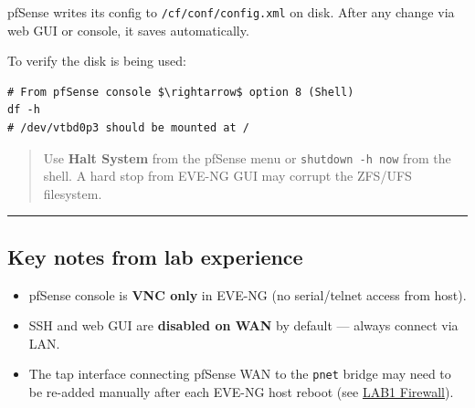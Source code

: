 pfSense writes its config to \texttt{/cf/conf/config.xml} on disk. After any change via web GUI or console, it saves automatically.

To verify the disk is being used:

\begin{lstlisting}
# From pfSense console $\rightarrow$ option 8 (Shell)
df -h
# /dev/vtbd0p3 should be mounted at /
\end{lstlisting}

\begin{quote}
Use \textbf{Halt System} from the pfSense menu or \texttt{shutdown -h now} from the shell. A hard stop from EVE-NG GUI may corrupt the ZFS/UFS filesystem.
\end{quote}

\begin{center}\rule{0.5\linewidth}{0.5pt}\end{center}

\subsection{Key notes from lab experience}

\begin{itemize}
\tightlist
\item
  pfSense console is \textbf{VNC only} in EVE-NG (no serial/telnet access from host).
\item
  SSH and web GUI are \textbf{disabled on WAN} by default --- always connect via LAN.
\item
  The tap interface connecting pfSense WAN to the \texttt{pnet} bridge may need to be re-added manually after each EVE-NG host reboot (see \href{../../labs/lab1/firewall.md}{LAB1 Firewall}).
\end{itemize}
